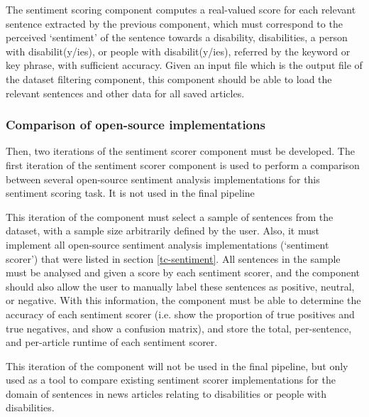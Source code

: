 \documentclass{report}
\begin{document}
The sentiment scoring component computes a real-valued score for each relevant sentence extracted by the previous component, which must correspond to the perceived `sentiment' of the sentence towards a disability, disabilities, a person with disabilit(y/ies), or people with disabilit(y/ies), referred by the keyword or key phrase, with sufficient accuracy.
Given an input file which is the output file of the dataset filtering component, this component should be able to load the relevant sentences and other data for all saved articles.

\subsubsection{Comparison of open-source implementations} \label{req-sentiment-comparison}

Then, two iterations of the sentiment scorer component must be developed.
The first iteration of the sentiment scorer component is used to perform a comparison between several open-source sentiment analysis implementations for this sentiment scoring task.
It is not used in the final pipeline

This iteration of the component must select a sample of sentences from the dataset, with a sample size arbitrarily defined by the user.
Also, it must implement all open-source sentiment analysis implementations (`sentiment scorer') that were listed in section \ref{tc-sentiment}.
All sentences in the sample must be analysed and given a score by each sentiment scorer, and the component should also allow the user to manually label these sentences as positive, neutral, or negative.
With this information, the component must be able to determine the accuracy of each sentiment scorer (i.e. show the proportion of true positives and true negatives, and show a confusion matrix), and store the total, per-sentence, and per-article runtime of each sentiment scorer.

This iteration of the component will not be used in the final pipeline, but only used as a tool to compare existing sentiment scorer implementations for the domain of sentences in news articles relating to disabilities or people with disabilities.

\end{document}
